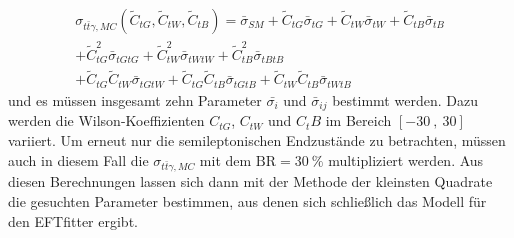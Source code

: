 \begin{align}
  \sigma_{t\bar{t}\gamma, MC}({\tilde{C}_{tG}, \tilde{C}_{tW}, \tilde{C}_{tB}}) = \bar{\sigma}_{SM} + \tilde{C}_{tG}\bar{\sigma}_{tG} + \tilde{C}_{tW}\bar{\sigma}_{tW} + \tilde{C}_{tB}\bar{\sigma}_{tB}\\
  + \tilde{C}_{tG}^2\bar{\sigma}_{tGtG} + \tilde{C}_{tW}^2\bar{\sigma}_{tWtW} + \tilde{C}_{tB}^2\bar{\sigma}_{tBtB}\\
  + \tilde{C}_{tG} \tilde{C}_{tW}\bar{\sigma}_{tGtW} + \tilde{C}_{tG} \tilde{C}_{tB}\bar{\sigma}_{tGtB} + \tilde{C}_{tW} \tilde{C}_{tB}\bar{\sigma}_{tWtB}
\end{align}
und es müssen insgesamt zehn Parameter $\bar{\sigma_i}$ und $\bar{\sigma}_{ij}$ bestimmt werden. Dazu werden die Wilson-Koeffizienten $C_{tG}$, $C_{tW}$ und $C_tB$ im Bereich $[-30~,~30]$ variiert. Um erneut nur die semileptonischen Endzustände zu betrachten, müssen auch in diesem Fall die $\sigma_{t\bar{t}\gamma, MC}$ mit dem $\mathrm{BR} = \SI{30}{\percent}$ multipliziert werden. Aus diesen Berechnungen lassen sich dann mit der Methode der kleinsten Quadrate die gesuchten Parameter bestimmen, aus denen sich schließlich das Modell für den EFTfitter ergibt.


